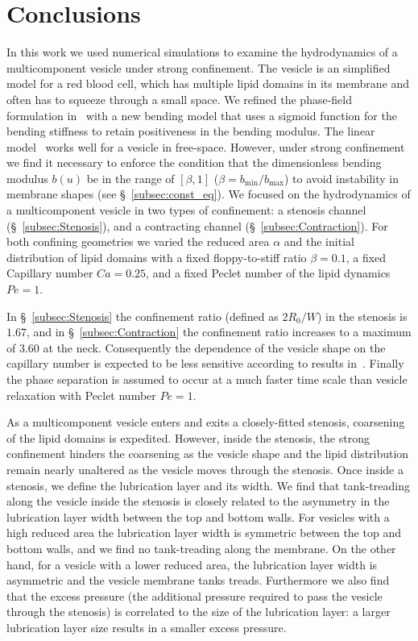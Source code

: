 \documentclass[twoside,twocolumn,9pt]{article}
\begin{document}
\section{Conclusions \label{sec:conclusion}}
In this work we used numerical simulations to examine the hydrodynamics
of a multicomponent vesicle under strong confinement. The vesicle is an
simplified model for a red blood cell, which has multiple lipid
domains in its membrane and often has to squeeze through a small space.
We refined the phase-field formulation in~\citet{liu-mar-li-vee-low2017}
with a new bending model that uses a sigmoid function for the bending
stiffness to retain positiveness in the bending modulus. The linear
model~\cite{liu-mar-li-vee-low2017} works well for a vesicle in
free-space. However, under strong confinement we find it necessary to
enforce the condition that the dimensionless bending modulus $b(u)$ be
in the range of $[\beta,1]$ ($\beta = b_{\min}/b_{\max}$) to avoid
instability in membrane shapes (see \S~\ref{subsec:const_eq}). We
focused on the hydrodynamics of a multicomponent vesicle in two types of
confinement: a stenosis channel (\S~\ref{subsec:Stenosis}), and a
contracting channel (\S~\ref{subsec:Contraction}). For both confining
geometries we varied the reduced area $\alpha$ and the initial
distribution of lipid domains with a fixed floppy-to-stiff ratio
$\beta=0.1$, a fixed Capillary number $Ca=0.25$, and a fixed Peclet
number of the lipid dynamics $Pe=1$. 

In \S~\ref{subsec:Stenosis} the confinement ratio (defined as $2R_0/W$)
in the stenosis is $1.67$, and in \S~\ref{subsec:Contraction} the
confinement ratio increases to a maximum of $3.60$ at the neck.
Consequently the dependence of the vesicle shape on the capillary number
is expected to be less sensitive according to results
in~\citet{aga-bir2020}. Finally the phase separation is assumed to occur
at a much faster time scale than vesicle relaxation with Peclet number
$Pe=1$.

As a multicomponent vesicle enters and exits a closely-fitted stenosis,
coarsening of the lipid domains is expedited. However, inside the
stenosis, the strong confinement hinders the coarsening as the vesicle
shape and the lipid distribution remain nearly unaltered as the
vesicle moves through the stenosis. Once inside a stenosis, we define
the lubrication layer and its width. We find that tank-treading along
the vesicle inside the stenosis is closely related to the asymmetry in
the lubrication layer width between the top and bottom walls. For
vesicles with a high reduced area the lubrication layer width is
symmetric between the top and bottom walls, and we find no tank-treading
along the membrane. On the other hand, for a vesicle with a lower
reduced area, the lubrication layer width is asymmetric and the vesicle
membrane tanks treads. Furthermore we also find that the excess pressure
(the additional pressure required to pass the vesicle through the
stenosis) is correlated to the size of the lubrication layer: a larger
lubrication layer size results in a smaller excess pressure.
\end{document}
